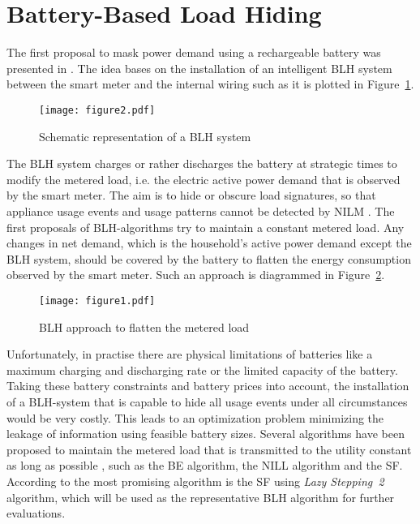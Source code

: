 \documentclass{article}
\begin{document}
\section{Battery-Based Load Hiding}\label{sec:BLH}
The first proposal to mask power demand using a rechargeable battery was presented in \cite{Kalogridis2010}. The idea bases on the installation of an intelligent \ac{BLH} system between the smart meter and the internal wiring such as it is plotted in Figure~\ref{blh_system}.

\begin{figure}[h!]
	\centering
	\texttt{[image: figure2.pdf]}
	\caption{Schematic representation of a \ac{BLH} system}
	\label{blh_system}
\end{figure}

The \ac{BLH} system charges or rather discharges the battery at strategic times to modify the metered load, i.e. the electric active power demand that is observed by the smart meter. The aim is to hide or obscure load signatures, so that appliance usage events and usage patterns cannot be detected by \ac{NILM} \cite{Kalogridis2010}. The first proposals of \ac{BLH}-algorithms try to maintain a constant metered load. Any changes in net demand, which is the household's active power demand except the \ac{BLH} system, should be covered by the battery to flatten the energy consumption observed by the smart meter. Such an approach is diagrammed in Figure~\ref{blh_method}.

\begin{figure}[h!]
	\centering
	\texttt{[image: figure1.pdf]}
	\caption{\ac{BLH} approach to flatten the metered load \cite{McLaughlin2011}}
	\label{blh_method}
\end{figure}

Unfortunately, in practise there are physical limitations of batteries like a maximum charging and discharging rate or the limited capacity of the battery. Taking these battery constraints and battery prices into account, the installation of a \ac{BLH}-system that is capable to hide all usage events under all circumstances would be very costly. This leads to an optimization problem minimizing the leakage of information using feasible battery sizes. Several algorithms have been proposed to maintain the metered load that is transmitted to the utility constant as long as possible \cite{Yang2012}, such as the \ac{BE} algorithm, the \ac{NILL} algorithm and the \ac{SF}. According to \cite{Yang2012} the most promising algorithm is the \ac{SF} using \textit{Lazy Stepping~2} algorithm, which will be used as the representative \ac{BLH} algorithm for further evaluations.
\end{document}
